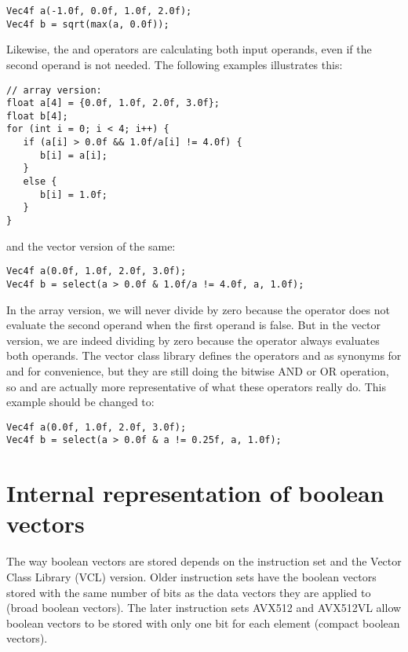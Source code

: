 \documentclass[vcl_manual.tex]{subfiles}
\begin{document}
\begin{lstlisting}[frame=none]
Vec4f a(-1.0f, 0.0f, 1.0f, 2.0f);
Vec4f b = sqrt(max(a, 0.0f));
\end{lstlisting}


Likewise, the \codei{\&} and \codei{|} operators are calculating both input operands, even if the second operand is not needed. The following examples illustrates this:

\begin{lstlisting}[frame=none]
// array version:
float a[4] = {0.0f, 1.0f, 2.0f, 3.0f};
float b[4];
for (int i = 0; i < 4; i++) {
   if (a[i] > 0.0f && 1.0f/a[i] != 4.0f) {
      b[i] = a[i]; 
   }
   else {
      b[i] = 1.0f;   
   }
}
\end{lstlisting}

and the vector version of the same:

\begin{lstlisting}[frame=none]
Vec4f a(0.0f, 1.0f, 2.0f, 3.0f);
Vec4f b = select(a > 0.0f & 1.0f/a != 4.0f, a, 1.0f);
\end{lstlisting}

In the array version, we will never divide by zero because the \codei{\&\&} operator does not evaluate the second operand when the first operand is false. But in the vector version, we are indeed dividing by zero because the \codei{\&} operator always evaluates both operands. The vector class library defines the operators \codei{\&\&} and \codei{||} as synonyms for \codei{\&} and \codei{|} for convenience, but they are still doing the bitwise AND or OR operation, so \codei{\&} and \codei{|} are actually more representative of what these operators really do. This example should be changed to:

\begin{lstlisting}[frame=none]
Vec4f a(0.0f, 1.0f, 2.0f, 3.0f);
Vec4f b = select(a > 0.0f & a != 0.25f, a, 1.0f);
\end{lstlisting}


\section{Internal representation of boolean vectors}\label{InternalRepresentationOfBoolean}

The way boolean vectors are stored depends on the instruction set and the Vector Class Library (VCL) version.
Older instruction sets have the boolean vectors stored with the same number of bits as the data vectors they are applied to (broad boolean vectors). The later instruction sets AVX512 and AVX512VL allow boolean vectors to be stored with only one bit for each element (compact boolean vectors). 
\end{document}
